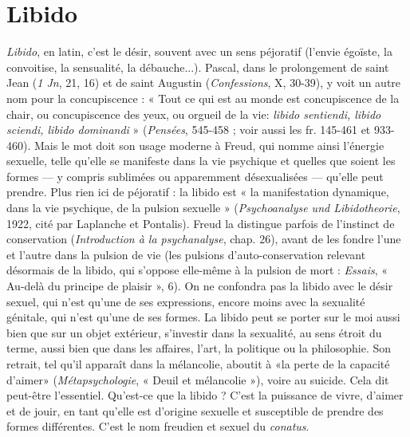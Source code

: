 {\section{Libido}
{\it Libido}, en latin, c’est le désir, souvent avec un sens péjoratif (l'envie
égoïste, la convoitise, la sensualité, la débauche...). Pascal, dans le
prolongement de saint Jean ({\it 1 Jn}, 21, 16) et de saint Augustin ({\it Confessions}, X,
30-39), y voit un autre nom pour la concupiscence : « Tout ce qui est au
monde est concupiscence de la chair, ou concupiscence des yeux, ou orgueil de
la vie: {\it libido sentiendi, libido sciendi, libido dominandi} » ({\it Pensées}, 545-458 ;
voir aussi les fr. 145-461 et 933-460). Mais le mot doit son usage moderne à
Freud, qui nomme ainsi l'énergie sexuelle, telle qu’elle se manifeste dans la vie
psychique et quelles que soient les formes — y compris sublimées ou apparemment
désexualisées — qu’elle peut prendre. Plus rien ici de péjoratif : la libido
est « la manifestation dynamique, dans la vie psychique, de la pulsion sexuelle »
({\it Psychoanalyse und Libidotheorie}, 1922, cité par Laplanche et Pontalis). Freud la
distingue parfois de l'instinct de conservation ({\it Introduction à la psychanalyse},
chap. 26), avant de les fondre l’une et l’autre dans la pulsion de vie (les pulsions
d’auto-conservation relevant désormais de la libido, qui s’oppose elle-même à
la pulsion de mort : {\it Essais}, « Au-delà du principe de plaisir », 6). On ne confondra
pas la libido avec le désir sexuel, qui n’est qu’une de ses expressions,
encore moins avec la sexualité génitale, qui n’est qu’une de ses formes. La
libido peut se porter sur le moi aussi bien que sur un objet extérieur, s'investir
dans la sexualité, au sens étroit du terme, aussi bien que dans les affaires, l’art,
la politique ou la philosophie. Son retrait, tel qu’il apparaît dans la mélancolie,
aboutit à «la perte de la capacité d’aimer» ({\it Métapsychologie}, « Deuil et
mélancolie »), voire au suicide. Cela dit peut-être l'essentiel. Qu'est-ce que la
libido ? C’est la puissance de vivre, d’aimer et de jouir, en tant qu’elle est d’origine
sexuelle et susceptible de prendre des formes différentes. C’est le nom
freudien et sexuel du {\it conatus}.

}
